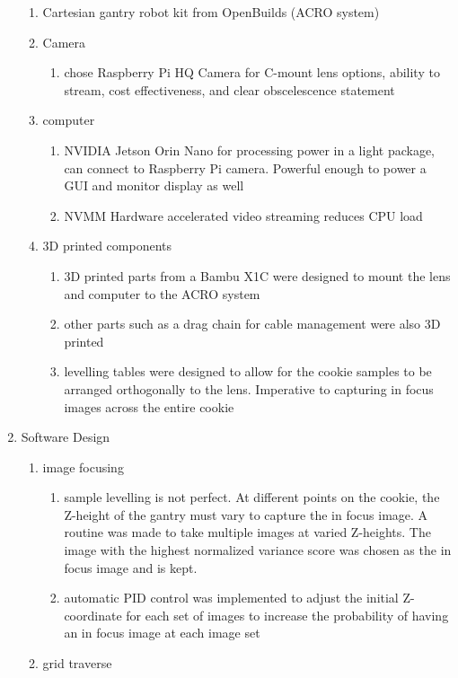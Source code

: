 \documentclass{article}
\begin{document}
\begin{outline}[enumerate]
\begin{enumerate}
\begin{enumerate}
			\item Cartesian gantry robot kit from OpenBuilds (ACRO system)
			\item Camera 
				\begin{enumerate}
				\item chose Raspberry Pi HQ Camera for C-mount lens options, ability to stream, cost effectiveness, and clear obscelescence statement
				\end{enumerate}
			\item computer
				\begin{enumerate}
				\item NVIDIA Jetson Orin Nano for processing power in a light package, can connect to Raspberry Pi camera. Powerful enough to power a GUI and monitor display as well
				\item NVMM Hardware accelerated video streaming reduces CPU load 
				\end{enumerate}
			\item 3D printed components
				\begin{enumerate}
				\item 3D printed parts from a Bambu X1C were designed to mount the lens and computer to the ACRO system
				\item other parts such as a drag chain for cable management were also 3D printed
				\item levelling tables were designed to allow for the cookie samples to be arranged orthogonally to the lens. Imperative to capturing in focus images across the entire cookie
				\end{enumerate}
			\end{enumerate}
		\item Software Design
			\begin{enumerate}
			\item image focusing
				\begin{enumerate}
				\item sample levelling is not perfect. At different points on the cookie, the Z-height of the gantry must vary to capture the in focus image. A routine was made to take multiple images at varied Z-heights. The image with the highest normalized variance score was chosen as the in focus image and is kept.
				\item automatic PID control was implemented to adjust the initial Z-coordinate for each set of images to increase the probability of having an in focus image at each image set
				\end{enumerate}
			\item grid traverse

\end{enumerate}
\end{enumerate}
\end{outline}
\end{document}
